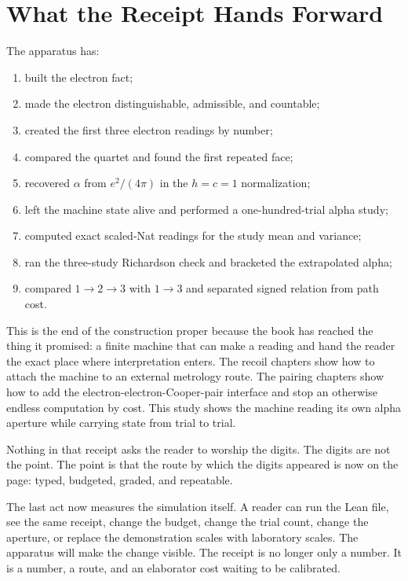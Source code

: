 \section{What the Receipt Hands Forward}

The apparatus has:
\begin{enumerate}
\item built the electron fact;
\item made the electron distinguishable, admissible, and countable;
\item created the first three electron readings by number;
\item compared the quartet and found the first repeated face;
\item recovered \(\alpha\) from \(e^2/(4\pi)\) in the \(h=c=1\) normalization;
\item left the machine state alive and performed a one-hundred-trial alpha study;
\item computed exact scaled-Nat readings for the study mean and variance;
\item ran the three-study Richardson check and bracketed the extrapolated alpha;
\item compared \(1\to2\to3\) with \(1\to3\) and separated signed relation from path cost.
\end{enumerate}

This is the end of the construction proper because the book has reached the thing it promised: a finite machine
that can make a reading and hand the reader the exact place where interpretation enters. The recoil chapters show
how to attach the machine to an external metrology route. The pairing chapters show how to add the
electron-electron-Cooper-pair interface and stop an otherwise endless computation by cost. This study shows the
machine reading its own alpha aperture while carrying state from trial to trial.

Nothing in that receipt asks the reader to worship the digits. The digits are not the point. The point is that
the route by which the digits appeared is now on the page: typed, budgeted, graded, and repeatable.

The last act now measures the simulation itself. A reader can run the Lean file, see the same receipt, change the
budget, change the trial count, change the aperture, or replace the demonstration scales with laboratory scales.
The apparatus will make the change visible. The receipt is no longer only a number. It is a number, a route, and
an elaborator cost waiting to be calibrated.

